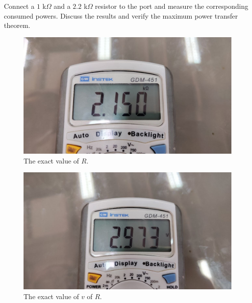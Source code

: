 \documentclass[11pt]{article}
\begin{document}
\begin{question}
\begin{subquestion}{Connect a $1$ k$\Omega$ and a $2.2$ k$\Omega$ resistor to the port and measure the corresponding consumed powers. Discuss the results and verify the maximum power transfer theorem.}
{\begin{figure}[H]
                \centering
                \includegraphics[scale=\PicScale,angle=0]{Fig/25.jpeg}
                \caption{The exact value of $R$.}
            \end{figure}
            \begin{figure}[H]
                \centering
                \includegraphics[scale=\PicScale,angle=0]{Fig/26.jpeg}
                \caption{The exact value of $v$ of $R$.}
            \end{figure}
        }
    \end{subquestion}


\end{question}

\end{document}
